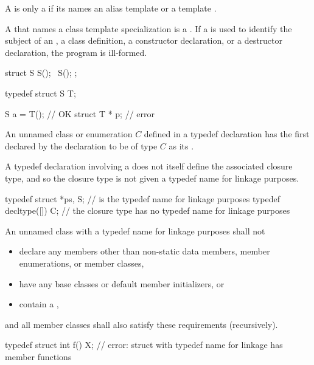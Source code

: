 \pnum
{}%
A  is only a 
if its  names
an alias template or a template .
\begin{note}
A  that names a class template specialization
is a .
If a  is used to identify the subject of an
, a class
definition, a constructor
declaration, or a destructor
declaration, the program is ill-formed.
\end{note}
\begin{example}
\begin{codeblock}
struct S {
  S();
  ~S();
};

typedef struct S T;

S a = T();                      // OK
struct T * p;                   // error
\end{codeblock}
\end{example}

\pnum
{}%
%
%
An unnamed class or enumeration $C$ defined in a typedef declaration has
the first 
declared by the declaration to be of type $C$
as its .
\begin{note}
A typedef declaration involving a 
does not itself define the associated closure type,
and so the closure type is not given a typedef name for linkage purposes.
\end{note}
\begin{example}
\begin{codeblock}
typedef struct { } *ps, S;      //  is the typedef name for linkage purposes
typedef decltype([]{}) C;       // the closure type has no typedef name for linkage purposes
\end{codeblock}
\end{example}

\pnum
An unnamed class with a typedef name for linkage purposes shall not
\begin{itemize}
\item
  declare any members
  other than non-static data members, member enumerations, or member classes,
\item
  have any base classes or default member initializers, or
\item
  contain a ,
\end{itemize}
and all member classes shall also satisfy these requirements (recursively).
\begin{example}
\begin{codeblock}
typedef struct {
  int f() {}
} X;                            // error: struct with typedef name for linkage has member functions
\end{codeblock}
\end{example}

